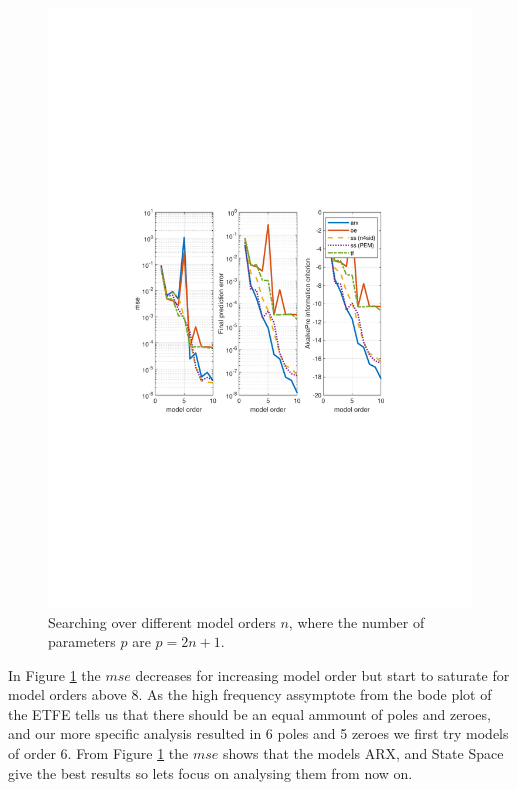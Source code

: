 \documentclass[]{article}
\begin{document}
\begin{figure}[ht]
\centering
\includegraphics[trim= 10cm 8cm 10cm 8cm, scale=0.7]{figures/model_order.pdf}
\caption{Searching over different model orders $n$, where the number of parameters $p$ are $p=2n+1$.}
\label{fig:model_order}
\end{figure}
In Figure \ref{fig:model_order} the $mse$ decreases for increasing model order but start to saturate for model orders above 8. As the high frequency assymptote from the bode plot of the ETFE tells us that there should be an equal ammount of poles and zeroes, and our more specific analysis resulted in 6 poles and 5 zeroes we first try models of order 6. From Figure \ref{fig:model_order} the $mse$ shows that the models ARX, and State Space give the best results so lets focus on analysing them from now on.
\end{document}
